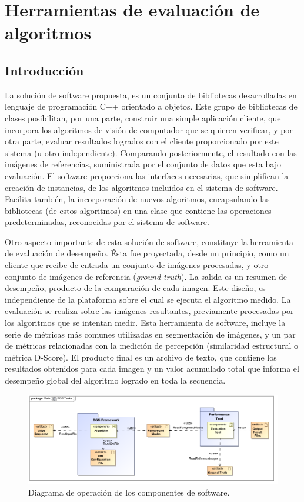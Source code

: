 \chapter{Herramientas de evaluación de algoritmos}

\section{Introducción}
La solución de software propuesta, es un conjunto de bibliotecas desarrolladas en lenguaje de programación C++ orientado a objetos. Este grupo de bibliotecas de clases posibilitan, por una parte, construir una simple aplicación cliente, que incorpora los algoritmos de visión de computador que se quieren verificar, y por otra parte, evaluar resultados logrados con el cliente proporcionado por este sistema (u otro independiente). Comparando posteriormente, el resultado con las imágenes de referencias, suministrada por el conjunto de datos que esta bajo evaluación. El software proporciona las interfaces necesarias, que simplifican la creación de instancias, de los algoritmos incluidos en el sistema de software. Facilita también, la incorporación de nuevos algoritmos, encapsulando las bibliotecas (de estos algoritmos) en una clase que contiene las operaciones predeterminadas, reconocidas por el sistema de software. 

Otro aspecto importante de esta solución de software, constituye la herramienta de evaluación de desempeño. Ésta fue proyectada, desde un principio, como un cliente que recibe de entrada un conjunto de imágenes procesadas, y otro conjunto de imágenes de referencia (\textit{ground-truth}). La salida es un resumen de desempeño, producto de la comparación de cada imagen. Este diseño, es independiente de la plataforma sobre el cual se ejecuta el algoritmo medido. La evaluación se realiza sobre las imágenes resultantes, previamente procesadas por los algoritmos que se intentan medir. Esta herramienta de software, incluye la serie de métricas más comunes utilizadas en segmentación de imágenes, y un par de métricas relacionadas con la medición de percepción (similaridad estructural o métrica D-Score). El producto final es un archivo de texto, que contiene los resultados obtenidos para cada imagen y un valor acumulado total que informa el desempeño global del algoritmo logrado en toda la secuencia.


\begin{figure}[h!]
\centering
\includegraphics[scale=0.5]{img/BGS_Tasks}
\caption[Diagrama de componentes]{Diagrama de operación de los componentes de software.}
\label{fig:bgs_tasks}
\end{figure}



